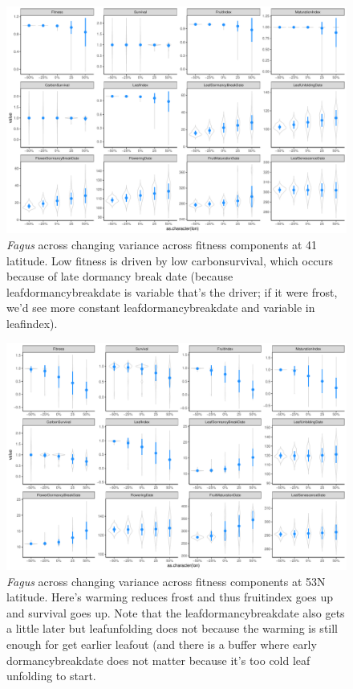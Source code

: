 \documentclass[11pt,letter]{article}
\begin{document}
\begin{figure} 
 \begin{center}
\noindent \includegraphics[width=1\textwidth]{..//analyses/graphs/phenofit/sims/sdsim41_allmetricsFS.pdf}
  \caption{\emph{Fagus} across changing variance across fitness components at 41 latitude. Low fitness is driven by low carbonsurvival, which occurs because of late dormancy break date (because leafdormancybreakdate is variable that's the driver; if it were frost, we'd see more constant leafdormancybreakdate and variable in leafindex).}
  \label{fig:fagussd41}
  \end{center}
\end{figure}

\begin{figure} 
 \begin{center}
\noindent \includegraphics[width=1\textwidth]{..//analyses/graphs/phenofit/sims/sdsim53_allmetricsFS.pdf}
  \caption{\emph{Fagus} across changing variance across fitness components at 53\degree N latitude. Here's warming reduces frost and thus fruitindex goes up and survival goes up. Note that the leafdormancybreakdate also gets a little later but leafunfolding does not because the warming is still enough for get earlier leafout (and there is a buffer where early dormancybreakdate does not matter because it's too cold leaf unfolding to start. }
  \label{fig:fagussd53}
  \end{center}
\end{figure}
\end{document}
